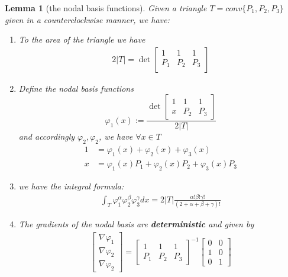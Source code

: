 \documentclass[a4paper,12pt,oneside,fleqn]{book}
\newtheorem{lemma}[theorem]{Lemma}
\theoremstyle{definition}
\theoremstyle{remark}
\begin{document}
\begin{lemma}[the nodal basis functions]
	Given a triangle $T = conv\{ P_1, P_2, P_3\}$ given in a counterclockwise manner, we have:
	\begin{enumerate}
		\item To the area of the triangle we have
		\begin{align*}
			2|T| = \det
			\begin{bmatrix}
				1 & 1 & 1\\
				P_1 & P_2& P_3\\
			\end{bmatrix}
		\end{align*}
		\item Define the nodal basis functions
		\begin{equation}
			\varphi_1(x)  := \frac{\det\begin{bmatrix}
				1 & 1 & 1\\
				x & P_2 & P_3
			\end{bmatrix} }{2|T|}
		\end{equation}
		and accordingly $\varphi_2, \varphi_2$, we have $\forall x \in T$
		\begin{align*}
			1 &= \varphi_1(x) + \varphi_2(x) + \varphi_3(x)\\
			x &= \varphi_1(x)P_1 + \varphi_2(x) P_2  + \varphi_3(x) P_3
		\end{align*}
		\item we have the integral formula:
		\begin{align*}
			\int_T \varphi_1^\alpha \varphi_2^\beta \varphi_3^\gamma dx = 2 |T| \frac{\alpha! \beta! \gamma!}{(2 + \alpha + \beta + \gamma)!}
		\end{align*}
		\item The gradients of the nodal basis are \textbf{deterministic} and given by
		\begin{align*}
			\begin{bmatrix}
				\nabla \varphi_1\\
				\nabla \varphi_2\\
				\nabla \varphi_2
			\end{bmatrix}
			= 
			\begin{bmatrix}
				1 & 1 & 1\\
				P_1 & P_2 & P_3
			\end{bmatrix}^{-1}
			\begin{bmatrix}
				0 & 0\\
				1 & 0\\
				0 & 1
			\end{bmatrix}
		\end{align*}
	\end{enumerate}
\end{lemma}
\end{document}
